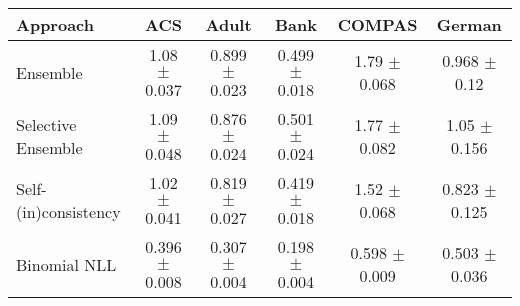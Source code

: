 \begin{tabular} {lccccc}
\toprule
\textbf{Approach} & \textbf{ACS} & \textbf{Adult} & \textbf{Bank} & \textbf{COMPAS} & \textbf{German} \\ \midrule
Ensemble & \cellcolor{bronze!30}1.08 $\pm$ 0.037 & 0.899 $\pm$ 0.023 & \cellcolor{bronze!30}0.499 $\pm$ 0.018 & 1.79 $\pm$ 0.068 & \cellcolor{bronze!30}0.968 $\pm$ 0.12 \\ 
Selective Ensemble & 1.09 $\pm$ 0.048 & \cellcolor{bronze!30}0.876 $\pm$ 0.024 & 0.501 $\pm$ 0.024 & \cellcolor{bronze!30}1.77 $\pm$ 0.082 & 1.05 $\pm$ 0.156 \\ 
Self-(in)consistency & \cellcolor{silver!30}1.02 $\pm$ 0.041 & \cellcolor{silver!30}0.819 $\pm$ 0.027 & \cellcolor{silver!30}0.419 $\pm$ 0.018 & \cellcolor{silver!30}1.52 $\pm$ 0.068 & \cellcolor{silver!30}0.823 $\pm$ 0.125 \\ 
Binomial NLL & \cellcolor{gold!30}0.396 $\pm$ 0.008 & \cellcolor{gold!30}0.307 $\pm$ 0.004 & \cellcolor{gold!30}0.198 $\pm$ 0.004 & \cellcolor{gold!30}0.598 $\pm$ 0.009 & \cellcolor{gold!30}0.503 $\pm$ 0.036 \\ 
\bottomrule
\end{tabular}

